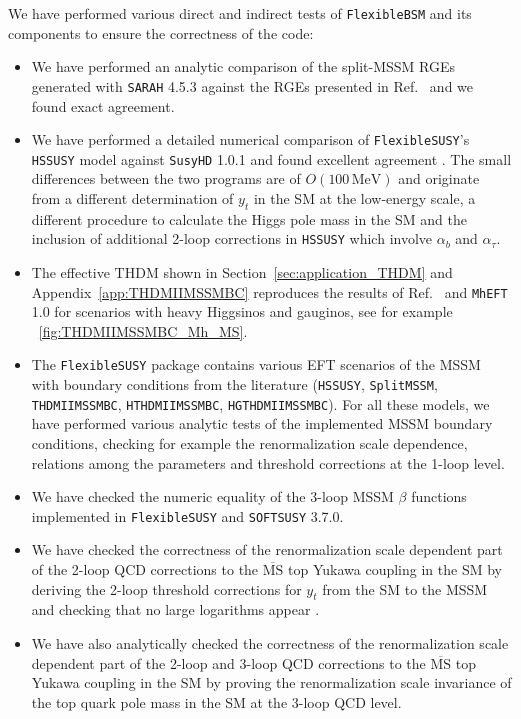 \documentclass[final,3p,11pt,pdflatex]{elsarticle}
\makeatletter
\newcommand{\modelname}[1]{\texttt{#1}\@\xspace}
\newcommand{\sarah}{\texttt{SARAH}\@\xspace}
\newcommand{\fs}{\texttt{FlexibleSUSY}\@\xspace}
\newcommand{\HSSUSY}{\modelname{HSSUSY}}
\newcommand{\susyhd}{\texttt{SusyHD}\@\xspace}
\newcommand{\MhEFT}{\texttt{MhEFT}\@\xspace}
\newcommand{\softsusy}{\texttt{SOFTSUSY}\@\xspace}
\newcommand{\fbsm}{\texttt{FlexibleBSM}\@\xspace}
\newcommand{\ol}[1]{\overline{#1}}
\newcommand{\MSbar}{\ensuremath{\ol{\text{MS}}}\xspace}
\newcommand{\unit}[1]{\,\text{#1}}      %
\newcommand{\THDM}{\ensuremath{\text{THDM}}\xspace}
\newcommand{\figref}[1]{\figurename~\ref{#1}}
\newcommand{\secref}[1]{Section~\ref{#1}}
\newcommand{\appref}[1]{Appendix~\ref{#1}}
\def\ab{\alpha_b}
\def\atau{\alpha_{\tau}}
\makeatother
\begin{document}
We have performed various direct and indirect tests of \fbsm and its
components to ensure the correctness of the code:
%
\begin{itemize}
\item We have performed an analytic comparison of the split-MSSM RGEs
  generated with \sarah 4.5.3 against the RGEs presented in
  Ref.~\cite{Benakli:2013msa} and we found exact agreement.
\item We have performed a detailed numerical comparison of \fs's
  \HSSUSY model against \susyhd 1.0.1 and found excellent agreement
  \cite{Athron:2016fuq}.  The small differences between the two
  programs are of $O(100\unit{MeV})$ and originate from a
  different determination of $y_t$ in the SM at the low-energy scale,
  a different procedure to calculate the Higgs pole mass in the SM and
  the inclusion of additional 2-loop corrections in \HSSUSY which
  involve $\ab$ and $\atau$.
\item The effective \THDM shown in \secref{sec:application_THDM} and
  \appref{app:THDMIIMSSMBC} reproduces the results of
  Ref.~\cite{Lee:2015uza} and \MhEFT 1.0 \cite{MhEFT} for scenarios with
  heavy Higgsinos and gauginos, see for example
  \figref{fig:THDMIIMSSMBC_Mh_MS}.
\item The \fs package contains various EFT scenarios of the MSSM with
  boundary conditions from the literature (\HSSUSY,
  \modelname{SplitMSSM}, \modelname{THDMIIMSSMBC}, \modelname{HTHDMIIMSSMBC},
  \modelname{HGTHDMIIMSSMBC}).  For all these models, we have performed
  various analytic tests of the implemented MSSM boundary conditions,
  checking for example the renormalization scale dependence, relations
  among the parameters and threshold corrections at the
  1-loop level.
\item We have checked the numeric equality of the 3-loop MSSM $\beta$
  functions implemented in \fs and \softsusy 3.7.0.
\item We have checked the correctness of the renormalization scale
  dependent part of the 2-loop QCD corrections to the \MSbar top
  Yukawa coupling in the SM by deriving the 2-loop
  threshold corrections for $y_t$ from the SM to the MSSM
  and checking that no large logarithms appear
  \cite{ThomasKwasnitza:2016yqj}.
\item We have also analytically checked the correctness of the
  renormalization scale dependent part of the 2-loop and 3-loop QCD
  corrections to the \MSbar top Yukawa coupling in the SM
  by proving the renormalization scale invariance of the top quark
  pole mass in the SM at the 3-loop QCD level.
\end{itemize}
\end{document}
